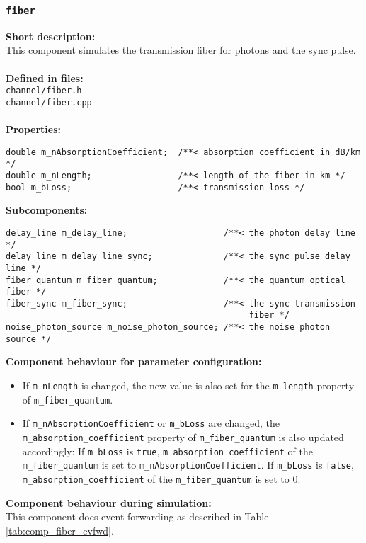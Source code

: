 \subsubsection{\texttt{fiber}}
\label{subsubsec:comp_fiber}

\textbf{Short description:}\\
This component simulates the transmission fiber for photons and the sync pulse.\\
\\
\textbf{Defined in files:}\\
\texttt{channel/fiber.h}\\
\texttt{channel/fiber.cpp}\\
\\
\textbf{Properties:}
\begin{lstlisting}
double m_nAbsorptionCoefficient;  /**< absorption coefficient in dB/km */
double m_nLength;                 /**< length of the fiber in km */
bool m_bLoss;                     /**< transmission loss */
\end{lstlisting}
\noindent
\textbf{Subcomponents:}
\begin{lstlisting}
delay_line m_delay_line;                   /**< the photon delay line */
delay_line m_delay_line_sync;              /**< the sync pulse delay line */
fiber_quantum m_fiber_quantum;             /**< the quantum optical fiber */
fiber_sync m_fiber_sync;                   /**< the sync transmission 
                                                fiber */
noise_photon_source m_noise_photon_source; /**< the noise photon source */
\end{lstlisting}
\noindent
\textbf{Component behaviour for parameter configuration:}
\begin{itemize}

\item If \texttt{m\_nLength} is changed, the new value is also set for the \texttt{m\_length} property of \texttt{m\_fiber\_quantum}.

\item If \texttt{m\_nAbsorptionCoefficient} or \texttt{m\_bLoss} are changed, the \texttt{m\_absorption\_coefficient} property of \texttt{m\_fiber\_quantum} is also updated accordingly: If \texttt{m\_bLoss} is \texttt{true}, \texttt{m\_absorption\_coefficient} of the \texttt{m\_fiber\_quantum} is set to \texttt{m\_nAbsorptionCoefficient}. If \texttt{m\_bLoss} is \texttt{false}, \texttt{m\_absorption\_coefficient} of the \texttt{m\_fiber\_quantum} is set to 0.
\end{itemize}
\noindent
\textbf{Component behaviour during simulation:}\\
This component does event forwarding as described in Table \ref{tab:comp_fiber_evfwd}.

